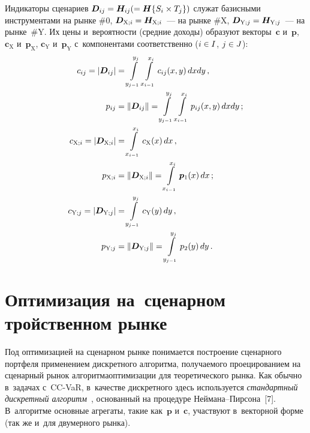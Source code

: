 \begin{multicols}{2}
  Индикаторы сценариев 
$\boldsymbol{D}_{ij}\hm = \boldsymbol{H}_{ij} (= \boldsymbol{H}\{S_i\hm\times T_j\})$ 
служат базисными инструментами на рынке \#0, 
$\boldsymbol{D}_{\mathrm{X};i}\hm = \boldsymbol{H}_{\mathrm{X};i}$~--- на рынке 
\#X, $\boldsymbol{D}_{\mathrm{Y};j}\hm = \boldsymbol{H}_{\mathrm{Y};j}$~--- на 
рынке~\#Y. Их цены и~вероятности (средние доходы) образуют 
векторы~$\boldsymbol{c}$ и~$\boldsymbol{p}$, $\boldsymbol{c}_{\mathrm{X}}$ 
и~$\boldsymbol{p}_{\mathrm{X}}$, $\boldsymbol{c}_{\mathrm{Y}}$ 
и~$\boldsymbol{p}_{\mathrm{Y}}$ с~компонентами соответственно ($i \hm\in I$, 
$j \hm\in J$):
  \begin{align*}
  c_{ij}=\left\vert  \boldsymbol{D}_{ij}\right\vert &= 
  \int\limits_{y_{j-1}}^{y_j} 
\int\limits^{x_i}_{x_{i-1}} c_{ij}(x,y)\,dxdy\,,\\
  p_{ij} &= \left\|  \boldsymbol{D}_{ij}\right\| = \int\limits_{y_{j-1}}^{y_j} 
\int\limits^{x_i}_{x_{i-1}} p_{ij}(x,y)\,dxdy\,;\\
  c_{\mathrm{X};i} =\left\vert \boldsymbol{D}_{\mathrm{X};i}\right\vert 
&=\int\limits_{x_{i-1}}^{x_i} {c}_{\mathrm{X}}(x)\,dx\,,\notag\\ 
  p_{\mathrm{X};i} &=\left\| \boldsymbol{D}_{\mathrm{X};i}\right\| 
=\int\limits_{x_{i-1}}^{x_i} \boldsymbol{p}_1(x)\,dx\,;%
\\
  c_{\mathrm{Y};j} =\left\vert \boldsymbol{D}_{\mathrm{Y};j}\right\vert 
&=\int\limits_{y_{j-1}}^{y_j} {c}_{\mathrm{Y}}(y)\,dy\,,\notag\\ 
   p_{\mathrm{Y};j} &=\left\| \boldsymbol{D}_{\mathrm{Y};j}\right\| 
   =\int\limits_{y_{j-1}}^{y_j} p_2 (y)\,dy \,. %
\end{align*}
  
  \section{Оптимизация на~сценарном тройственном рынке}
  
  Под оптимизацией на сценарном рынке понимается построение сценарного 
портфеля при\-ме\-нением дискретного алгоритма, получаемого про\-ецированием 
на сценарный рынок алгоритма\linebreak оптимизации для теоретического рынка. Как 
обычно в~задачах с~CC-VaR, в~качестве дискретного здесь используется 
\textit{стандартный дискретный алгоритм}~\cite{2-ags, 3-ags, 4-ags, 5-ags}, 
основанный на процедуре Ней\-ма\-на--Пир\-со\-на~[7]. В~алгоритме основные 
агрегаты, такие как~$\boldsymbol{p}$ и~$\boldsymbol{c}$, участвуют 
в~векторной форме (так же и~для двумерного рынка). 
  

\end{multicols}
